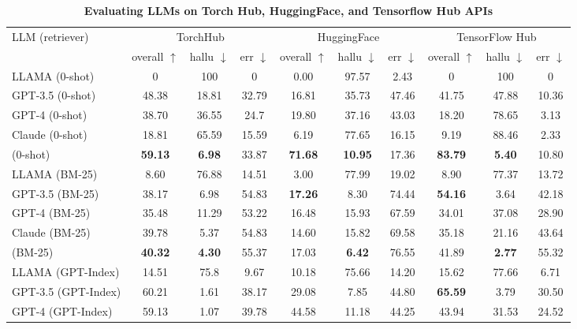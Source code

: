 \begin{table}[h]
    \caption{\small \textbf{Evaluating LLMs on Torch Hub, HuggingFace, and Tensorflow Hub APIs}}
    \label{tab:llm_eval}
     \setlength{\tabcolsep}{10pt} %
    \begin{adjustbox}{width=\textwidth}
    \begin{tabular}{l c c c | c c c | c c c}
    \toprule
    
    LLM (retriever) & \multicolumn{3}{c}{TorchHub} & \multicolumn{3}{c}{HuggingFace} & \multicolumn{3}{c}{TensorFlow Hub} \\
    & overall $\uparrow$ & hallu $\downarrow$ & err $\downarrow$ & overall $\uparrow$ & hallu $\downarrow$ & err $\downarrow$ & overall $\uparrow$ & hallu $\downarrow$ & err $\downarrow$ \\
    \midrule
    LLAMA (0-shot) & 0 & 100 & 0 & 0.00 & 97.57 & 2.43 & 0 & 100 & 0 \\
    GPT-3.5 (0-shot) & 48.38 & 18.81 & 32.79 & 16.81 & 35.73 & 47.46 & 41.75 & 47.88 & 10.36 \\
    GPT-4 (0-shot) & 38.70 & 36.55 & 24.7 & 19.80 & 37.16 & 43.03 & 18.20 & 78.65 & 3.13 \\
    Claude (0-shot) & 18.81 & 65.59 & 15.59 & 6.19 & 77.65 & 16.15 & 9.19 & 88.46 & 2.33 \\
    \gorilla{} (0-shot) & \textbf{59.13} & \textbf{6.98} & 33.87 & \textbf{71.68} & \textbf{10.95} & 17.36 & \textbf{83.79} & \textbf{5.40} & 10.80 \\
    \midrule
    LLAMA (BM-25) & 8.60 & 76.88 & 14.51 & 3.00 & 77.99 & 19.02 & 8.90 & 77.37 & 13.72 \\
    GPT-3.5 (BM-25) & 38.17 & 6.98 & 54.83 & \textbf{17.26} & 8.30 & 74.44 & \textbf{54.16} & 3.64 & 42.18 \\
    GPT-4 (BM-25) & 35.48 & 11.29 & 53.22 & 16.48 & 15.93 & 67.59 & 34.01 & 37.08 & 28.90 \\
    Claude (BM-25) & 39.78 & 5.37 & 54.83 & 14.60 & 15.82 & 69.58 & 35.18 & 21.16 & 43.64 \\
    \gorilla{} (BM-25) & \textbf{40.32} & \textbf{4.30} & 55.37 & 17.03 & \textbf{6.42} & 76.55 & 41.89 & \textbf{2.77} & 55.32 \\
    \midrule
    LLAMA (GPT-Index) & 14.51 & 75.8 & 9.67 & 10.18 & 75.66 & 14.20 & 15.62 & 77.66 & 6.71 \\
    GPT-3.5 (GPT-Index) & 60.21 & 1.61 & 38.17 & 29.08 & 7.85 & 44.80 & \textbf{65.59} & 3.79 & 30.50 \\
    GPT-4 (GPT-Index) & 59.13 & 1.07 & 39.78 & 44.58 & 11.18 & 44.25 & 43.94 & 31.53 & 24.52 \\

\end{tabular}
\end{adjustbox}
\end{table}
